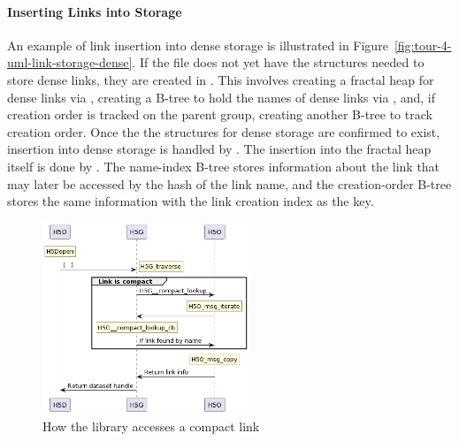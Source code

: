 \paragraph{Inserting Links into Storage} An example of link insertion into dense storage is illustrated in Figure~\ref{fig:tour-4-uml-link-storage-dense}. If the file does not yet have the structures needed to store dense links, they are created in . This involves creating a fractal heap for dense links via , creating a B-tree to hold the names of dense links via , and, if creation order is tracked on the parent group, creating another B-tree to track creation order. Once the the structures for dense storage are confirmed to exist, insertion into dense storage is handled by . The insertion into the fractal heap itself is done by . The name-index B-tree stores information about the link that may later be accessed by the hash of the link name, and the creation-order B-tree stores the same information with the link creation index as the key.

\begin{figure}
\centering
\includegraphics[width=0.55\textwidth]{images/tour_4_uml_link_access_compact.png}
\caption{How the library accesses a compact link}
\label{fig:tour-4-uml-link-access-compact}
\end{figure}

